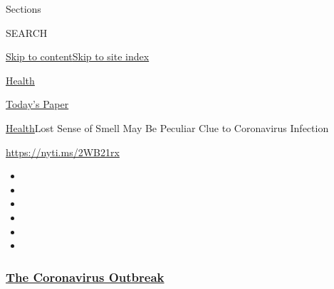 Sections

SEARCH

\protect\hyperlink{site-content}{Skip to
content}\protect\hyperlink{site-index}{Skip to site index}

\href{https://www.nytimes3xbfgragh.onion/section/health}{Health}

\href{https://myaccount.nytimes3xbfgragh.onion/auth/login?response_type=cookie\&client_id=vi}{}

\href{https://www.nytimes3xbfgragh.onion/section/todayspaper}{Today's
Paper}

\href{/section/health}{Health}\textbar{}Lost Sense of Smell May Be
Peculiar Clue to Coronavirus Infection

\url{https://nyti.ms/2WB21rx}

\begin{itemize}
\item
\item
\item
\item
\item
\item
\end{itemize}

\hypertarget{the-coronavirus-outbreak}{%
\subsubsection{\texorpdfstring{\href{https://www.nytimes3xbfgragh.onion/news-event/coronavirus?name=styln-coronavirus-national\&region=TOP_BANNER\&block=storyline_menu_recirc\&action=click\&pgtype=Article\&impression_id=2a5e83f0-f1c5-11ea-b5fb-29abc66233f3\&variant=undefined}{The
Coronavirus
Outbreak}}{The Coronavirus Outbreak}}\label{the-coronavirus-outbreak}}

